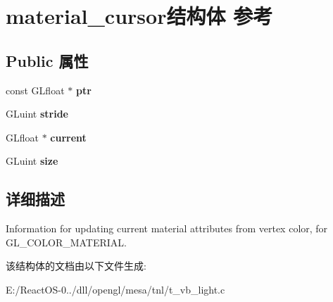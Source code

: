 \hypertarget{structmaterial__cursor}{}\section{material\+\_\+cursor结构体 参考}
\label{structmaterial__cursor}
\subsection*{Public 属性}
\begin{DoxyCompactItemize}
\item 
\mbox{\label{structmaterial__cursor_a01a7458c70391ae7534a45029e15d1ec}} 
const G\+Lfloat $\ast$ {\bfseries ptr}
\item 
\mbox{\label{structmaterial__cursor_a68f2db9bf6d92bbdff299532896fc7c8}} 
G\+Luint {\bfseries stride}
\item 
\mbox{\label{structmaterial__cursor_a025cebad1774e5c513d77402e5898f7e}} 
G\+Lfloat $\ast$ {\bfseries current}
\item 
\mbox{\label{structmaterial__cursor_acdc1115c1aa77c3252237ed3ce16c1c2}} 
G\+Luint {\bfseries size}
\end{DoxyCompactItemize}


\subsection{详细描述}
Information for updating current material attributes from vertex color, for G\+L\+\_\+\+C\+O\+L\+O\+R\+\_\+\+M\+A\+T\+E\+R\+I\+AL. 

该结构体的文档由以下文件生成\+:\begin{DoxyCompactItemize}
\item 
E\+:/\+React\+O\+S-\/0../dll/opengl/mesa/tnl/t\+\_\+vb\+\_\+light.\+c\end{DoxyCompactItemize}
